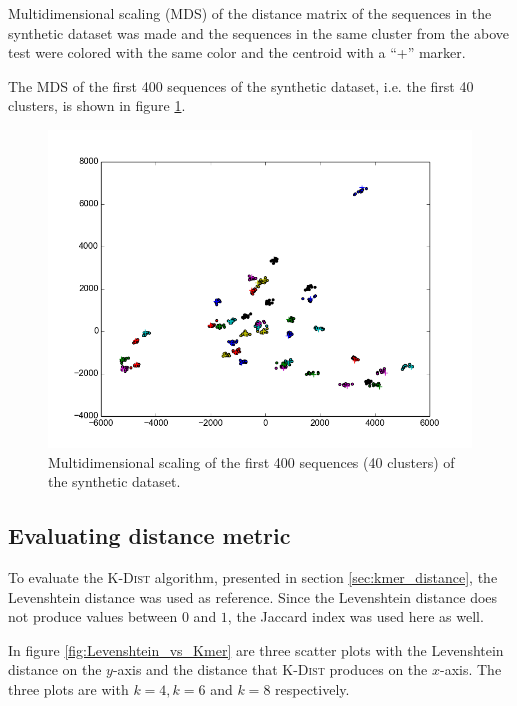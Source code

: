 Multidimensional scaling (MDS) of the distance matrix of the sequences in the
synthetic dataset was made and the sequences in the same cluster from the above
test were colored with the same color and the centroid with a ``+'' marker.

The MDS of the first 400 sequences of the synthetic dataset, i.e. the first 40
clusters, is shown in figure \ref{fig:mds_synth}.

\begin{figure}[H]
  \includegraphics[width=\textwidth]{graphics/MDS_t-SNE_synth_silva_400.png}
  \caption{Multidimensional scaling of the first 400 sequences (40 clusters) of
    the synthetic dataset.}
  \label{fig:mds_synth}
\end{figure}




\subsection{Evaluating distance metric}

To evaluate the \textsc{K-Dist} algorithm, presented in section
\ref{sec:kmer_distance}, the Levenshtein distance was used as reference. Since
the Levenshtein distance does not produce values between $0$ and $1$, the
Jaccard index was used here as well. %

In figure \ref{fig:Levenshtein_vs_Kmer} are three scatter plots with the
Levenshtein distance on the $y$-axis and the distance that \textsc{K-Dist}
produces on the $x$-axis. The three plots are with $k=4, k=6$ and $k=8$ respectively.

